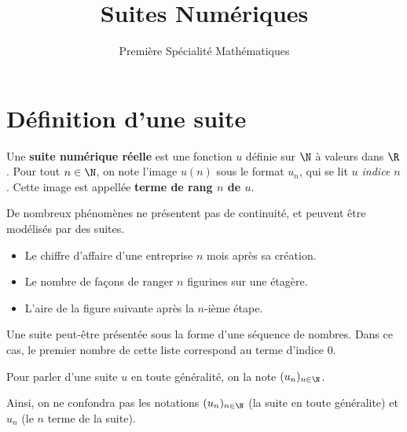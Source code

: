 \documentclass{article}
\title{Suites Numériques}
\author{Première Spécialité Mathématiques}
\date{}
\begin{document}
\maketitle
\section{Définition d'une suite}
\begin{tcolorbox}
\begin{definition}
Une \textbf{suite numérique réelle} est une fonction $u$ définie sur $\N$ à valeurs dans $\R$. Pour tout $n \in \N$, on note l'image $u(n)$ sous le format $u_n$, qui se lit \emph{\og $u$ indice $n$ \fg}. Cette image est appellée \textbf{terme de rang $n$ de $u$}.
\end{definition}
\end{tcolorbox}
\begin{example}
De nombreux phénomènes ne présentent pas de continuité, et peuvent être modélisés par des suites.
\begin{itemize}
\item Le chiffre d'affaire d'une entreprise $n$ mois après sa création.
\item Le nombre de façons de ranger $n$ figurines sur une étagère.
\item L'aire de la figure suivante après la $n$-ième étape.
\begin{center}
\end{center}
\end{itemize}
\end{example}
\begin{remark}
Une suite peut-être présentée sous la forme d'une séquence de nombres. Dans ce cas, le premier nombre de cette liste correspond au terme d'indice $0$.
\end{remark}
\begin{tcolorbox}
Pour parler d'une suite $u$ en toute généralité, on la note $(u_n)_{n \in \N}$.
\end{tcolorbox}
\begin{remark}
Ainsi, on ne confondra pas les notations $(u_n)_{n \in \N}$ (la suite en toute généralite) et $u_n$ (le $n$\ieme{} terme de la suite).
\end{remark}
\end{document}
